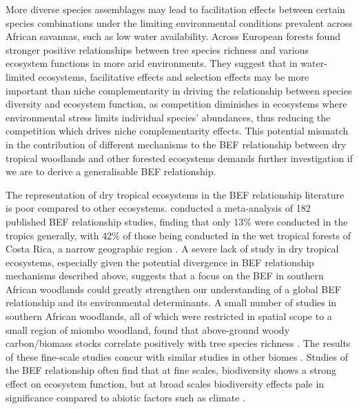 \documentclass[11pt,a4paper]{article}
\begin{document}
More diverse species assemblages may lead to facilitation effects between certain species combinations under the limiting environmental conditions prevalent across African savannas, such as low water availability. Across European forests \citet{Ratcliffe2017} found stronger positive relationships between tree species richness and various ecosystem functions in more arid environments. They suggest that in water-limited ecosystems, facilitative effects and selection effects may be more important than niche complementarity in driving the relationship between species diversity and ecosystem function, as competition diminishes in ecosystems where environmental stress limits individual species' abundances, thus reducing the competition which drives niche complementarity effects. This potential mismatch in the contribution of different mechanisms to the BEF relationship between dry tropical woodlands and other forested ecosystems demands further investigation if we are to derive a generalisable BEF relationship.

The representation of dry tropical ecosystems in the BEF relationship literature is poor compared to other ecosystems. \citet{Clarke2017} conducted a meta-analysis of 182 published BEF relationship studies, finding that only 13\% were conducted in the tropics generally, with 42\% of those being conducted in the wet tropical forests of Costa Rica, a narrow geographic region \citep{Barthlott2005}. A severe lack of study in dry tropical ecosystems, especially given the potential divergence in BEF relationship mechanisms described above, suggests that a focus on the BEF in southern African woodlands could greatly strengthen our understanding of a global BEF relationship and its environmental determinants. A small number of studies in southern African woodlands, all of which were restricted in spatial scope to a small region of miombo woodland, found that above-ground woody carbon/biomass stocks correlate positively with tree species richness \citep{McNicol2018, Shirima2015, Mutowo2012}. The results of these fine-scale studies concur with similar studies in other biomes \citep{Cardinale2009}. Studies of the BEF relationship often find that at fine scales, biodiversity shows a strong effect on ecosystem function, but at broad scales biodiversity effects pale in significance compared to abiotic factors such as climate \citep{Pasari2013}. 
\end{document}
